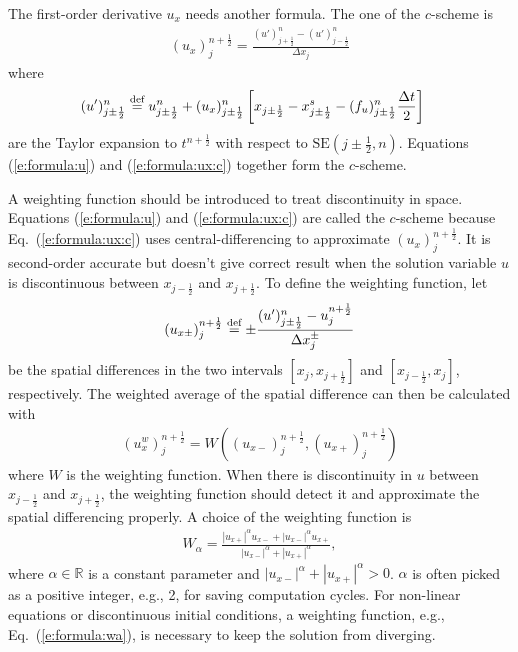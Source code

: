 \documentclass{turgon}
\begin{document}
The first-order derivative $u_x$ needs another formula.  The one of the
$c$-scheme is
\begin{align}
  (u_x)_j^{n+\frac{1}{2}} = \frac{
    (u')_{j+\frac{1}{2}}^n - (u')_{j-\frac{1}{2}}^n
  }{\Delta x_j}
  \label{e:formula:ux:c}
\end{align}
where
\begin{align*}
  (u')_{j\pm\frac{1}{2}}^n &\defeq
      u_{j\pm\frac{1}{2}}^n
    + (u_x)_{j\pm\frac{1}{2}}^n \left[
        x_{j\pm\frac{1}{2}} - x_{j\pm\frac{1}{2}}^s
      - (f_u)_{j\pm\frac{1}{2}}^n \frac{\Delta t}{2} \right]
\end{align*}
are the Taylor expansion to $t^{n+\frac{1}{2}}$ with respect to
$\mathrm{SE}(j\pm\frac{1}{2}, n)$.  Equations (\ref{e:formula:u}) and
(\ref{e:formula:ux:c}) together form the $c$-scheme.

A weighting function should be introduced to treat discontinuity in space.
Equations (\ref{e:formula:u}) and (\ref{e:formula:ux:c}) are called the
$c$-scheme because Eq.~(\ref{e:formula:ux:c}) uses central-differencing to
approximate $(u_x)_j^{n+\frac{1}{2}}$.  It is second-order accurate but doesn't
give correct result when the solution variable $u$ is discontinuous between
$x_{j-\frac{1}{2}}$ and $x_{j+\frac{1}{2}}$.  To define the weighting function,
let
\begin{align*}
  (u_{x\pm})_j^{n+\frac{1}{2}} \defeq
    \pm\frac{
      (u')_{j\pm\frac{1}{2}}^n - u_j^{n+\frac{1}{2}}
    }{\Delta x_j^{\pm}}
\end{align*}
be the spatial differences in the two intervals $[x_j, x_{j+\frac{1}{2}}]$ and
$[x_{j-\frac{1}{2}}, x_j]$, respectively.  The weighted average of the spatial
difference can then be calculated with
\begin{align*}
  (u_x^w)_j^{n+\frac{1}{2}} =
  W\left(
    (u_{x-})_j^{n+\frac{1}{2}}, (u_{x+})_j^{n+\frac{1}{2}}
  \right)
\end{align*}
where $W$ is the weighting function.  When there is discontinuity in $u$
between $x_{j-\frac{1}{2}}$ and $x_{j+\frac{1}{2}}$, the weighting function
should detect it and approximate the spatial differencing properly.  A choice
of the weighting function is
\begin{align}
  W_{\alpha} =
    \frac{|u_{x+}|^{\alpha}u_{x-} + |u_{x-}|^{\alpha}u_{x+}}
         {|u_{x-}|^{\alpha} + |u_{x+}|^{\alpha}},
  \label{e:formula:wa}
\end{align}
where $\alpha \in \mathbb{R}$ is a constant parameter and $|u_{x-}|^{\alpha} +
|u_{x+}|^{\alpha} > 0$.  $\alpha$ is often picked as a positive integer, e.g.,
2, for saving computation cycles.  For non-linear equations or discontinuous
initial conditions, a weighting function, e.g., Eq.~(\ref{e:formula:wa}), is
necessary to keep the solution from diverging.
\end{document}
